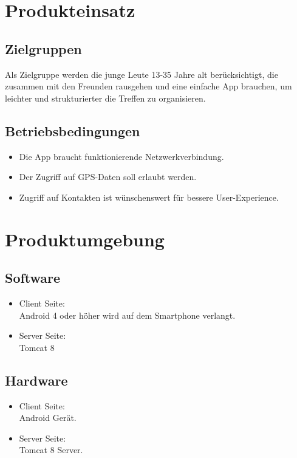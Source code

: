 \documentclass[parskip=full]{scrartcl}
\begin{document}
\section{Produkteinsatz}
\subsection{Zielgruppen}
Als Zielgruppe werden die junge Leute 13-35 Jahre alt berücksichtigt, die zusammen mit den Freunden rausgehen und eine einfache App brauchen, um leichter und strukturierter die Treffen zu organisieren.

\subsection{Betriebsbedingungen}
\begin{itemize}
\item Die App braucht funktionierende Netzwerkverbindung.\\
\item Der Zugriff auf GPS-Daten soll erlaubt werden.\\
\item Zugriff auf Kontakten ist wünschenswert für bessere User-Experience.
\end{itemize}
\section{Produktumgebung}

\subsection{Software}
\begin{itemize}
	\item Client Seite:\\
	Android 4 oder höher wird auf dem Smartphone verlangt.
	\item Server Seite:\\
	Tomcat 8 
\end{itemize}


\subsection{Hardware}
\begin{itemize}
\item Client Seite: \\ Android Gerät.\\
\item Server Seite: \\ Tomcat 8 Server.
\end{itemize}
\end{document}
